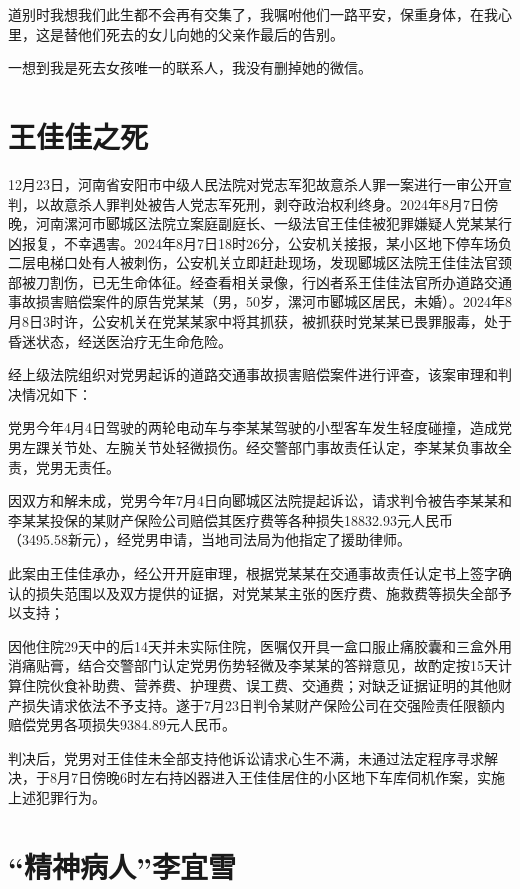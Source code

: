 道别时我想我们此生都不会再有交集了，我嘱咐他们一路平安，保重身体，在我心里，这是替他们死去的女儿向她的父亲作最后的告别。

一想到我是死去女孩唯一的联系人，我没有删掉她的微信。

\section{王佳佳之死}

12月23日，河南省安阳市中级人民法院对党志军犯故意杀人罪一案进行一审公开宣判，以故意杀人罪判处被告人党志军死刑，剥夺政治权利终身。2024年8月7日傍晚，河南漯河市郾城区法院立案庭副庭长、一级法官王佳佳被犯罪嫌疑人党某某行凶报复，不幸遇害。2024年8月7日18时26分，公安机关接报，某小区地下停车场负二层电梯口处有人被刺伤，公安机关立即赶赴现场，发现郾城区法院王佳佳法官颈部被刀割伤，已无生命体征。经查看相关录像，行凶者系王佳佳法官所办道路交通事故损害赔偿案件的原告党某某（男，50岁，漯河市郾城区居民，未婚）。2024年8月8日3时许，公安机关在党某某家中将其抓获，被抓获时党某某已畏罪服毒，处于昏迷状态，经送医治疗无生命危险。

经上级法院组织对党男起诉的道路交通事故损害赔偿案件进行评查，该案审理和判决情况如下：

党男今年4月4日驾驶的两轮电动车与李某某驾驶的小型客车发生轻度碰撞，造成党男左踝关节处、左腕关节处轻微损伤。经交警部门事故责任认定，李某某负事故全责，党男无责任。

因双方和解未成，党男今年7月4日向郾城区法院提起诉讼，请求判令被告李某某和李某某投保的某财产保险公司赔偿其医疗费等各种损失18832.93元人民币（3495.58新元），经党男申请，当地司法局为他指定了援助律师。

此案由王佳佳承办，经公开开庭审理，根据党某某在交通事故责任认定书上签字确认的损失范围以及双方提供的证据，对党某某主张的医疗费、施救费等损失全部予以支持；

因他住院29天中的后14天并未实际住院，医嘱仅开具一盒口服止痛胶囊和三盒外用消痛贴膏，结合交警部门认定党男伤势轻微及李某某的答辩意见，故酌定按15天计算住院伙食补助费、营养费、护理费、误工费、交通费；对缺乏证据证明的其他财产损失请求依法不予支持。遂于7月23日判令某财产保险公司在交强险责任限额内赔偿党男各项损失9384.89元人民币。

判决后，党男对王佳佳未全部支持他诉讼请求心生不满，未通过法定程序寻求解决，于8月7日傍晚6时左右持凶器进入王佳佳居住的小区地下车库伺机作案，实施上述犯罪行为。

\section{“精神病人”李宜雪}

